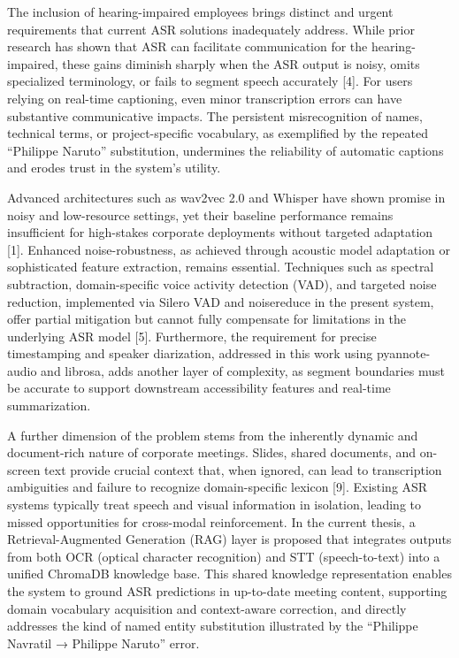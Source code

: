 \documentclass[12pt,a4paper]{article}
\begin{document}
The inclusion of hearing-impaired employees brings distinct and urgent requirements that current ASR solutions inadequately address. While prior research has shown that ASR can facilitate communication for the hearing-impaired, these gains diminish sharply when the ASR output is noisy, omits specialized terminology, or fails to segment speech accurately [4]. For users relying on real-time captioning, even minor transcription errors can have substantive communicative impacts. The persistent misrecognition of names, technical terms, or project-specific vocabulary, as exemplified by the repeated “Philippe Naruto” substitution, undermines the reliability of automatic captions and erodes trust in the system’s utility.


Advanced architectures such as wav2vec 2.0 and Whisper have shown promise in noisy and low-resource settings, yet their baseline performance remains insufficient for high-stakes corporate deployments without targeted adaptation [1]. Enhanced noise-robustness, as achieved through acoustic model adaptation or sophisticated feature extraction, remains essential. Techniques such as spectral subtraction, domain-specific voice activity detection (VAD), and targeted noise reduction, implemented via Silero VAD and noisereduce in the present system, offer partial mitigation but cannot fully compensate for limitations in the underlying ASR model [5]. Furthermore, the requirement for precise timestamping and speaker diarization, addressed in this work using pyannote-audio and librosa, adds another layer of complexity, as segment boundaries must be accurate to support downstream accessibility features and real-time summarization.


A further dimension of the problem stems from the inherently dynamic and document-rich nature of corporate meetings. Slides, shared documents, and on-screen text provide crucial context that, when ignored, can lead to transcription ambiguities and failure to recognize domain-specific lexicon [9]. Existing ASR systems typically treat speech and visual information in isolation, leading to missed opportunities for cross-modal reinforcement. In the current thesis, a Retrieval-Augmented Generation (RAG) layer is proposed that integrates outputs from both OCR (optical character recognition) and STT (speech-to-text) into a unified ChromaDB knowledge base. This shared knowledge representation enables the system to ground ASR predictions in up-to-date meeting content, supporting domain vocabulary acquisition and context-aware correction, and directly addresses the kind of named entity substitution illustrated by the “Philippe Navratil → Philippe Naruto” error.
\end{document}
